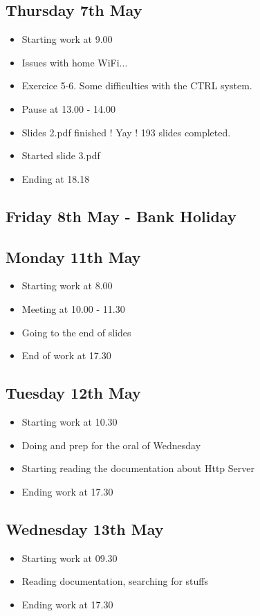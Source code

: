 \documentclass[a4paper, 10pt]{article}
\begin{document}
\subsection*{Thursday 7th May}
\begin{itemize}
    \item Starting work at 9.00
    \item Issues with home WiFi...
    \item Exercice 5-6. Some difficulties with the CTRL system.
    \item Pause at 13.00 - 14.00
    \item Slides 2.pdf finished ! Yay ! 193 slides completed.
    \item Started slide 3.pdf
    \item Ending at 18.18
\end{itemize}

\subsection*{Friday 8th May - Bank Holiday}

\subsection*{Monday 11th May}
\begin{itemize}
    \item Starting work at 8.00
    \item Meeting at 10.00 - 11.30
    \item Going to the end of slides
    \item End of work at 17.30
\end{itemize}

\subsection*{Tuesday 12th May}
\begin{itemize}
    \item Starting work at 10.30
    \item Doing and prep for the oral of Wednesday
    \item Starting reading the documentation about Http Server
    \item Ending work at 17.30
\end{itemize}

\subsection*{Wednesday 13th May}
\begin{itemize}
    \item Starting work at 09.30
    \item Reading documentation, searching for stuffs
    \item Ending work at 17.30
\end{itemize}
\end{document}
